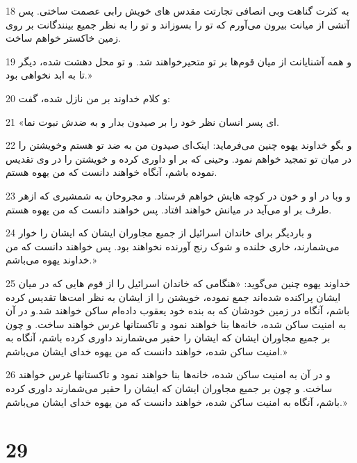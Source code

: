 \par 18 به کثرت گناهت وبی انصافی تجارتت مقدس های خویش رابی عصمت ساختی. پس آتشی از میانت بیرون می‌آورم که تو را بسوزاند و تو را به نظر جمیع بینندگانت بر روی زمین خاکستر خواهم ساخت.
\par 19 و همه آشنایانت از میان قوم‌ها بر تو متحیرخواهند شد. و تو محل دهشت شده، دیگر تا به ابد نخواهی بود.»
\par 20 و کلام خداوند بر من نازل شده، گفت:
\par 21 «ای پسر انسان نظر خود را بر صیدون بدار و به ضدش نبوت نما.
\par 22 و بگو خداوند یهوه چنین می‌فرماید: اینک‌ای صیدون من به ضد تو هستم وخویشتن را در میان تو تمجید خواهم نمود. وحینی که بر او داوری کرده و خویشتن را در وی تقدیس نموده باشم، آنگاه خواهند دانست که من یهوه هستم.
\par 23 و وبا در او و خون در کوچه هایش خواهم فرستاد. و مجروحان به شمشیری که ازهر طرف بر او می‌آید در میانش خواهند افتاد. پس خواهند دانست که من یهوه هستم.
\par 24 و باردیگر برای خاندان اسرائیل از جمیع مجاوران ایشان که ایشان را خوار می‌شمارند، خاری خلنده و شوک رنج آورنده نخواهند بود. پس خواهند دانست که من خداوند یهوه می‌باشم.»
\par 25 خداوند یهوه چنین می‌گوید: «هنگامی که خاندان اسرائیل را از قوم هایی که در میان ایشان پراکنده شده‌اند جمع نموده، خویشتن را از ایشان به نظر امت‌ها تقدیس کرده باشم، آنگاه در زمین خودشان که به بنده خود یعقوب داده‌ام ساکن خواهند شد.و در آن به امنیت ساکن شده، خانه‌ها بنا خواهند نمود و تاکستانها غرس خواهند ساخت. و چون بر جمیع مجاوران ایشان که ایشان را حقیر می‌شمارند داوری کرده باشم، آنگاه به امنیت ساکن شده، خواهند دانست که من یهوه خدای ایشان می‌باشم.»
\par 26 و در آن به امنیت ساکن شده، خانه‌ها بنا خواهند نمود و تاکستانها غرس خواهند ساخت. و چون بر جمیع مجاوران ایشان که ایشان را حقیر می‌شمارند داوری کرده باشم، آنگاه به امنیت ساکن شده، خواهند دانست که من یهوه خدای ایشان می‌باشم.»

\chapter{29}

